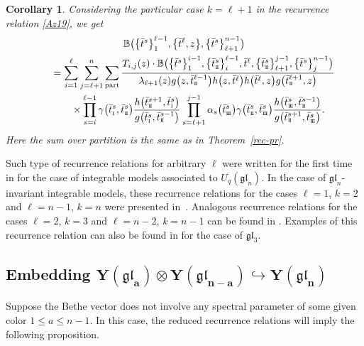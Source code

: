 \documentclass[10pt,a4paper]{amsart}
\newcommand{\so}{\scriptscriptstyle \rm I}
\newcommand{\st}{\scriptscriptstyle \rm I\hspace{-1pt}I}
\newcommand{\sth}{\scriptscriptstyle \rm I\hspace{-1pt}I\hspace{-1pt}I}
\newcommand{\bt}{{\bar t}}
\newtheorem{cor}[thm]{Corollary}
\theoremstyle{definition}
\def\BB{{\mathbb{B}}}
\def\r#1{\eqref{#1}}
\begin{document}
\begin{cor}\label{cor1}
Considering the particular case $k=\ell+1$ in the recurrence relation \r{Az19}, we get
\begin{gather*}
\BB\bigl(\bigl\{\bt^s\bigr\}_1^{\ell-1},\bigl\{\bt^\ell,z\bigr\},\bigl\{\bt^s\bigr\}_{\ell+1}^{n-1}\bigr)\\
\qquad=
\sum_{i=1}^\ell\sum_{j=\ell+1}^n\sum_{\rm part}\frac{T_{i,j}(z)\cdot
\BB\bigl(\bigl\{\bt^s\bigr\}_1^{i-1},\bigl\{\bt^s_{\st}\bigr\}_i^{\ell-1},\bt^\ell,
\bigl\{\bt^s_{\st}\bigr\}_{\ell+1}^{j-1},\bigl\{\bt^s\bigr\}_{j}^{n-1}\bigr)}
{\lambda_{\ell+1}(z) g\bigl(z,\bt^{\ell-1}_{\st}\bigr)h\bigl(z,\bt^\ell\bigr)h\bigl(\bt^\ell,z\bigr)g\bigl(\bt^{\ell+1}_{\st},z\bigr)}
\\
\qquad\phantom{=}{}\times
\prod_{s=i}^{\ell-1}\gamma\bigl(\bt^{s}_{\so},\bt^s_{\st}\bigr)
\frac{h\bigl(\bt^{s+1}_{\st},\bt^{s}_{\so}\bigr)}
{g\bigl(\bt^{s}_{\so},\bt^{s-1}_{\st}\bigr)}
\prod_{s=\ell+1}^{j-1}\alpha_s\bigl(\bt^s_{\sth}\bigr)\gamma\bigl(\bt^{s}_{\st},\bt^s_{\sth}\bigr)
\frac{h\bigl(\bt^{s}_{\sth},\bar t^{s-1}_{\st}\bigr)}{g\bigl(\bt^{s+1}_{\st},\bt^{s}_{\sth}\bigr)} .
\end{gather*}
Here the sum over partition is the same as in Theorem~{\rm\ref{rec-pr}}.
\end{cor}
Such type of recurrence relations for arbitrary $\ell$ were written for the first time in \cite{LP22} for the case of integrable
models associated to $U_q(\mathfrak{gl}_n)$. In the case of $\mathfrak{gl}_n$-invariant integrable
models, these recurrence relations for the cases $\ell=1$, $k=2$ and $\ell=n-1$, $k=n$
were presented in~\cite{HLPRS-SP17}.
Analogous recurrence relations for the cases
$\ell=2$, $k=3$ and $\ell=n-2$, $k=n-1$ can be found in \cite{G23}.
Examples of this recurrence relation can also be found in \cite{BPRS13} for the case of $\mathfrak{gl}_3$.


\subsection[Embedding Y(gl\_a)otimes Y(gl\_n-a) Y(gl\_n)]{Embedding $\boldsymbol{Y(\mathfrak{gl}_{a})\otimes Y(\mathfrak{gl}_{n-a})\hookrightarrow Y(\mathfrak{gl}_{n})}$}\label{sect:red-gl.x.gl}

Suppose the Bethe vector does not involve any spectral parameter
of some given color $1\leq a\leq n-1$. In this case, the
 reduced
recurrence relations will imply the following proposition.
\end{document}
